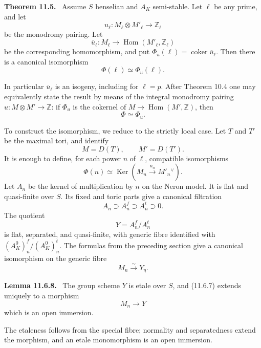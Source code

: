 \documentclass[11pt]{article}
\newcommand{\Hom}{\operatorname{Hom}}
\newcommand{\Ker}{\operatorname{Ker}}
\newcommand{\Z}{\mathbb Z}
\newcommand{\coker}{\operatorname{coker}}
\newenvironment{statement}[1]{\par\medskip\noindent\textbf{#1.}\ }{\par\medskip}
\begin{document}
\begin{statement}{Theorem 11.5}
Assume \(S\) henselian and \(A_K\) semi-stable.  Let \(\ell\) be any prime, and let
\[
        u_\ell:M_\ell\otimes M'_\ell\longrightarrow\Z_\ell
\]
be the monodromy pairing.  Let
\[
        \overline u_\ell:M_\ell\longrightarrow\Hom(M'_\ell,\Z_\ell)
\]
be the corresponding homomorphism, and put \(\Phi_u(\ell)=\coker\overline u_\ell\).  Then there is a canonical isomorphism
\begin{equation}\tag{11.5.1}
        \Phi(\ell)\simeq\Phi_u(\ell).
\end{equation}
\end{statement}
In particular \(\overline u_\ell\) is an isogeny, including for \(\ell=p\).  After Theorem 10.4 one may equivalently state the result by means of the integral monodromy pairing \(u:M\otimes M'\to\Z\): if \(\Phi_u\) is the cokernel of \(M\to\Hom(M',\Z)\), then
\begin{equation}\tag{11.5.3}
        \Phi\simeq\Phi_u.
\end{equation}

To construct the isomorphism, we reduce to the strictly local case.  Let \(T\) and \(T'\) be the maximal tori, and identify
\begin{equation}\tag{11.6.1}
        M=D(T),\qquad M'=D(T').
\end{equation}
It is enough to define, for each power \(n\) of \(\ell\), compatible isomorphisms
\begin{equation}\tag{11.6.4}
        \Phi(n)\simeq \Ker(M_n\xrightarrow{\overline u_n}M'_n{}^\vee).
\end{equation}
Let \(A_n\) be the kernel of multiplication by \(n\) on the Neron model.  It is flat and quasi-finite over \(S\).  Its fixed and toric parts give a canonical filtration
\begin{equation}\tag{11.6.5}
        A_n\supset A_n^f\supset A_n^t\supset0.
\end{equation}
The quotient
\begin{equation}\tag{11.6.6}
        Y=A_n^f/A_n^t
\end{equation}
is flat, separated, and quasi-finite, with generic fibre identified with \((A_K^0)^f_n/(A_K^0)^t_n\).  The formulas from the preceding section give a canonical isomorphism on the generic fibre
\begin{equation}\tag{11.6.7}
        M_n\xrightarrow{\sim}Y_\eta.
\end{equation}

\begin{statement}{Lemma 11.6.8}
The group scheme \(Y\) is etale over \(S\), and (11.6.7) extends uniquely to a morphism
\begin{equation}\tag{11.6.8.1}
        M_n\longrightarrow Y
\end{equation}
which is an open immersion.
\end{statement}
The etaleness follows from the special fibre; normality and separatedness extend the morphism, and an etale monomorphism is an open immersion.
\end{document}
